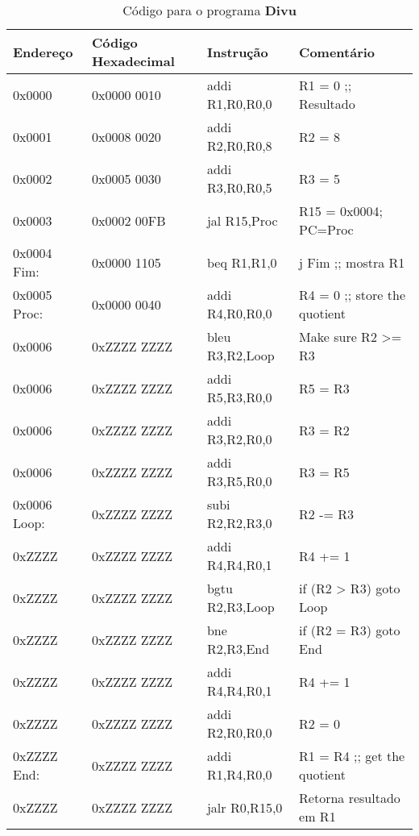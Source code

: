 \documentclass[12pt]{article}
\begin{document}
\begin{table}[H]
    \centering
    \caption{Código para o programa \textbf{Divu}}
    \begin{tabular}{|l|l|l|l|}\hline
        \textbf{Endereço} & \textbf{Código Hexadecimal} & \textbf{Instrução} & \textbf{Comentário} \\\hline
        0x0000       & 0x0000 0010 & addi R1,R0,R0,0 & R1 = 0 ;; Resultado           \\\hline
        0x0001       & 0x0008 0020 & addi R2,R0,R0,8 & R2 = 8                        \\\hline
        0x0002       & 0x0005 0030 & addi R3,R0,R0,5 & R3 = 5                        \\\hline
        0x0003       & 0x0002 00FB & jal R15,Proc    & R15 = 0x0004; PC=Proc         \\\hline
        0x0004 Fim:  & 0x0000 1105 & beq R1,R1,0     & j Fim ;; mostra R1            \\\hline
        0x0005 Proc: & 0x0000 0040 & addi R4,R0,R0,0 & R4 = 0 ;; store the quotient  \\\hline
        0x0006       & 0xZZZZ ZZZZ & bleu R3,R2,Loop & Make sure R2 >= R3            \\\hline
        0x0006       & 0xZZZZ ZZZZ & addi R5,R3,R0,0 & R5 = R3                       \\\hline
        0x0006       & 0xZZZZ ZZZZ & addi R3,R2,R0,0 & R3 = R2                       \\\hline
        0x0006       & 0xZZZZ ZZZZ & addi R3,R5,R0,0 & R3 = R5                       \\\hline
        0x0006 Loop: & 0xZZZZ ZZZZ & subi R2,R2,R3,0 & R2 -= R3                      \\\hline
        0xZZZZ       & 0xZZZZ ZZZZ & addi R4,R4,R0,1 & R4 += 1                       \\\hline
        0xZZZZ       & 0xZZZZ ZZZZ & bgtu R2,R3,Loop & if (R2 > R3) goto Loop        \\\hline
        0xZZZZ       & 0xZZZZ ZZZZ & bne  R2,R3,End  & if (R2 \!= R3) goto End       \\\hline
        0xZZZZ       & 0xZZZZ ZZZZ & addi R4,R4,R0,1 & R4 += 1                       \\\hline
        0xZZZZ       & 0xZZZZ ZZZZ & addi R2,R0,R0,0 & R2 = 0                        \\\hline
        0xZZZZ End:  & 0xZZZZ ZZZZ & addi R1,R4,R0,0 & R1 = R4 ;; get the quotient   \\\hline
        0xZZZZ       & 0xZZZZ ZZZZ & jalr R0,R15,0   & Retorna resultado em R1       \\\hline
    \end{tabular}\label{tab:programs:divu}
\end{table}
\end{document}
